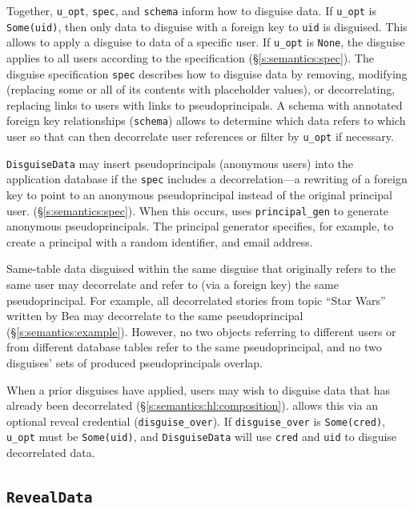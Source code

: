 Together, \texttt{u\_opt}, \texttt{spec}, and \texttt{schema} inform \sys how to
disguise data.  If \texttt{u\_opt} is \texttt{Some(uid)}, then only data to
disguise with a foreign key to \texttt{uid} is disguised. This allows \sys to
apply a disguise to data of a specific user. 
%
If \texttt{u\_opt} is \texttt{None}, the disguise applies to all users according
to the specification (\S\ref{s:semantics:spec}).
%
The disguise specification \texttt{spec} describes how to disguise data by
removing, modifying (replacing some or all of its contents with placeholder
values), or decorrelating, replacing links to users with links to
pseudoprincipals.
%
A schema with annotated foreign key relationships (\texttt{schema}) allows \sys
to determine which data refers to which user so that \sys can then decorrelate
user references or filter by \texttt{u\_opt} if necessary. 

%
\texttt{DisguiseData} may insert pseudoprincipals (anonymous users) into the
application database if the \texttt{spec} includes a decorrelation---a rewriting
of a foreign key to point to an anonymous pseudoprincipal instead of the
original principal user.  (\S\ref{s:semantics:spec}).  When this occurs, \sys
uses \texttt{principal\_gen} to generate anonymous pseudoprincipals. The
principal generator specifies, for example, to create a principal with a random
identifier, and email address.
%

%
Same-table data disguised within the same disguise that originally refers to the
same user may decorrelate and refer to (via a foreign key) the same
pseudoprincipal.
%
For example, all decorrelated stories from topic ``Star Wars'' written by Bea
may decorrelate to the same pseudoprincipal (\S\ref{s:semantics:example}).
%
However, no two objects referring to different users or from different database
tables refer to the same pseudoprincipal, and no two disguises' sets of produced
pseudoprincipals overlap.
%

When a prior disguises have applied, users may wish to disguise data that has
already been decorrelated (\S\ref{s:semantics:hl:composition}).  \sys allows
this via an optional reveal credential (\texttt{disguise\_over}). If
\texttt{disguise\_over} is \texttt{Some(cred)}, \texttt{u\_opt} must be
\texttt{Some(uid)}, and \texttt{DisguiseData} will use \texttt{cred} and
\texttt{uid} to disguise decorrelated data.

\subsection{\texttt{RevealData}}
\label{s:semantics:revealdata}

